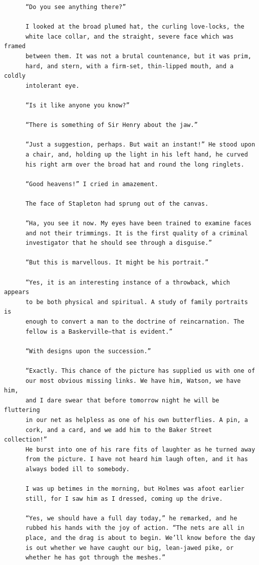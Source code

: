 \documentclass{article}
\begin{document}
\begin{verbatim}
      “Do you see anything there?”

      I looked at the broad plumed hat, the curling love-locks, the
      white lace collar, and the straight, severe face which was framed
      between them. It was not a brutal countenance, but it was prim,
      hard, and stern, with a firm-set, thin-lipped mouth, and a coldly
      intolerant eye.

      “Is it like anyone you know?”

      “There is something of Sir Henry about the jaw.”

      “Just a suggestion, perhaps. But wait an instant!” He stood upon
      a chair, and, holding up the light in his left hand, he curved
      his right arm over the broad hat and round the long ringlets.

      “Good heavens!” I cried in amazement.

      The face of Stapleton had sprung out of the canvas.

      “Ha, you see it now. My eyes have been trained to examine faces
      and not their trimmings. It is the first quality of a criminal
      investigator that he should see through a disguise.”

      “But this is marvellous. It might be his portrait.”

      “Yes, it is an interesting instance of a throwback, which appears
      to be both physical and spiritual. A study of family portraits is
      enough to convert a man to the doctrine of reincarnation. The
      fellow is a Baskerville—that is evident.”

      “With designs upon the succession.”

      “Exactly. This chance of the picture has supplied us with one of
      our most obvious missing links. We have him, Watson, we have him,
      and I dare swear that before tomorrow night he will be fluttering
      in our net as helpless as one of his own butterflies. A pin, a
      cork, and a card, and we add him to the Baker Street collection!”
      He burst into one of his rare fits of laughter as he turned away
      from the picture. I have not heard him laugh often, and it has
      always boded ill to somebody.

      I was up betimes in the morning, but Holmes was afoot earlier
      still, for I saw him as I dressed, coming up the drive.

      “Yes, we should have a full day today,” he remarked, and he
      rubbed his hands with the joy of action. “The nets are all in
      place, and the drag is about to begin. We’ll know before the day
      is out whether we have caught our big, lean-jawed pike, or
      whether he has got through the meshes.”


\end{verbatim}
\end{document}
